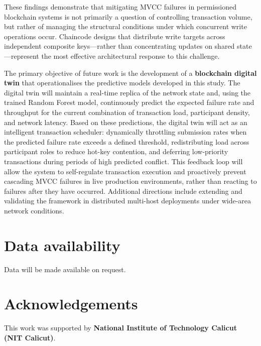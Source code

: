 \documentclass[12pt]{article}
\begin{document}
These findings demonstrate that mitigating MVCC failures in permissioned blockchain systems is not primarily a question of controlling transaction volume, but rather of managing the structural conditions under which concurrent write operations occur. Chaincode designs that distribute write targets across independent composite keys---rather than concentrating updates on shared state---represent the most effective architectural response to this challenge.

The primary objective of future work is the development of a \textbf{blockchain digital twin} that operationalises the predictive models developed in this study. The digital twin will maintain a real-time replica of the network state and, using the trained Random Forest model, continuously predict the expected failure rate and throughput for the current combination of transaction load, participant density, and network latency. Based on these predictions, the digital twin will act as an intelligent transaction scheduler: dynamically throttling submission rates when the predicted failure rate exceeds a defined threshold, redistributing load across participant roles to reduce hot-key contention, and deferring low-priority transactions during periods of high predicted conflict. This feedback loop will allow the system to self-regulate transaction execution and proactively prevent cascading MVCC failures in live production environments, rather than reacting to failures after they have occurred. Additional directions include extending and validating the framework in distributed multi-host deployments under wide-area network conditions.
	
	\section*{Data availability}
	Data will be made available on request.
	
	\section*{Acknowledgements}
	This work was supported by \textbf{National Institute of Technology Calicut (NIT Calicut)}.
	
	
	\appendix
	

	
	
	\clearpage

	
\end{document}

